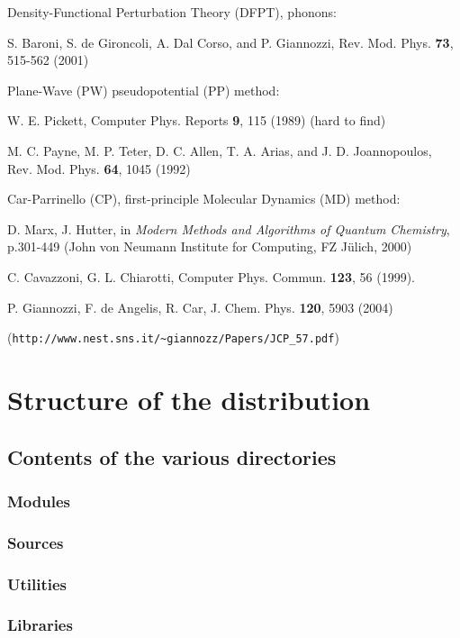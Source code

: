 \documentclass[12pt]{article}
\begin{document}
\par\medskip\noindent
Density-Functional Perturbation Theory (DFPT), phonons:
\par
S. Baroni, S. de Gironcoli, A. Dal Corso, and P. Giannozzi,
Rev. Mod. Phys. {\bf 73}, 515-562 (2001)

\par\medskip\noindent
Plane-Wave (PW) pseudopotential (PP) method:
\par
W. E. Pickett, Computer Phys. Reports {\bf 9}, 115 (1989)
(hard to find)
\par
M. C. Payne, M. P. Teter, D. C. Allen, T. A. Arias, and
J. D. Joannopoulos, Rev. Mod. Phys. {\bf 64}, 1045 (1992)

\par\medskip\noindent
Car-Parrinello (CP), first-principle Molecular Dynamics (MD) method:
\par
D. Marx, J. Hutter, in {\em Modern Methods and Algorithms of
Quantum Chemistry}, p.301-449 (John von Neumann Institute for Computing,
FZ J\"ulich, 2000)
\par
C. Cavazzoni, G. L. Chiarotti, Computer Phys. Commun.
{\bf 123}, 56 (1999).
\par
P. Giannozzi, F. de Angelis, R. Car, J. Chem. Phys. {\bf 120}, 5903
(2004)\par
({\tt http://www.nest.sns.it/\~{}giannozz/Papers/JCP\_57.pdf})

\section{Structure of the distribution}

\subsection{Contents of the various directories}
\subsubsection{Modules}
\subsubsection{Sources}
\subsubsection{Utilities}
\subsubsection{Libraries}
\end{document}
